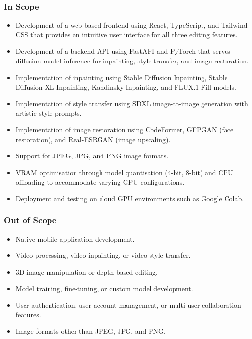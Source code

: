 \documentclass[12pt,a4paper]{report}
\begin{document}
\subsubsection{In Scope}
\begin{itemize}
    \item Development of a web-based frontend using React, TypeScript, and Tailwind CSS that provides an intuitive user interface for all three editing features.
    \item Development of a backend API using FastAPI and PyTorch that serves diffusion model inference for inpainting, style transfer, and image restoration.
    \item Implementation of inpainting using Stable Diffusion Inpainting, Stable Diffusion XL Inpainting, Kandinsky Inpainting, and FLUX.1 Fill models.
    \item Implementation of style transfer using SDXL image-to-image generation with artistic style prompts.
    \item Implementation of image restoration using CodeFormer, GFPGAN (face restoration), and Real-ESRGAN (image upscaling).
    \item Support for JPEG, JPG, and PNG image formats.
    \item VRAM optimisation through model quantisation (4-bit, 8-bit) and CPU offloading to accommodate varying GPU configurations.
    \item Deployment and testing on cloud GPU environments such as Google Colab.
\end{itemize}

\subsubsection{Out of Scope}
\begin{itemize}
    \item Native mobile application development.
    \item Video processing, video inpainting, or video style transfer.
    \item 3D image manipulation or depth-based editing.
    \item Model training, fine-tuning, or custom model development.
    \item User authentication, user account management, or multi-user collaboration features.
    \item Image formats other than JPEG, JPG, and PNG.
\end{itemize}
\end{document}

